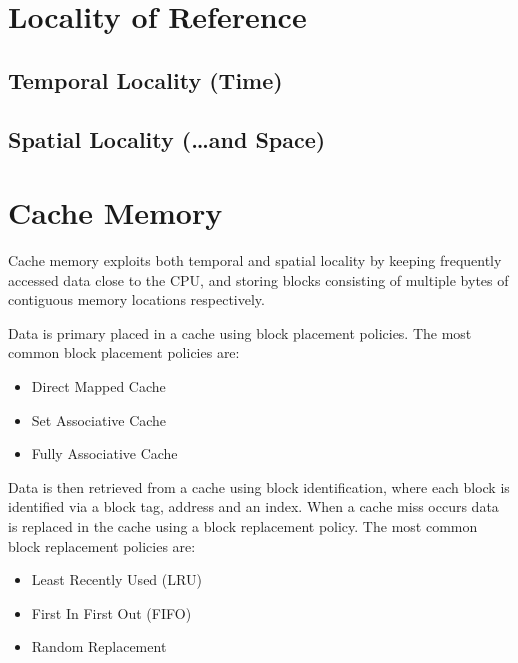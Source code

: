 \documentclass[12pt letter]{report}
\begin{document}
\section{Locality of Reference}


\subsection{Temporal Locality (Time)}


\subsection{Spatial Locality (\ldots and Space)}


\section{Cache Memory}

Cache memory exploits both temporal and spatial locality by keeping frequently accessed data close to the CPU, and storing blocks consisting of multiple bytes of contiguous memory locations respectively.

Data is primary placed in a cache using block placement policies. The most common block placement policies are:
\begin{itemize}
  \item Direct Mapped Cache
  \item Set Associative Cache
  \item Fully Associative Cache
\end{itemize}
Data is then retrieved from a cache using block identification, where each block is identified via a block tag, address and an index. When a cache miss occurs data is replaced in the cache using a block replacement policy. The most common block replacement policies are:
\begin{itemize}
  \item Least Recently Used (LRU)
  \item First In First Out (FIFO)
  \item Random Replacement
\end{itemize}
\end{document}
